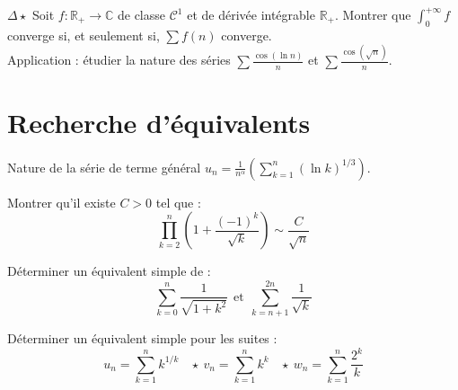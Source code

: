 \documentclass[french,a4paper]{article}
\newcommand{\R}{\mathbb{R}}
\newcommand{\C}{\mathbb{C}}
\theoremstyle{plain}
\theoremstyle{definition}
\theoremstyle{remark}
\begin{document}
\begin{ex}[Moulin.44]{$\Delta\star$}
	Soit $f:\R_+\to\C$ de classe $\mathcal{C}^1$ et de dérivée intégrable $\R_+$. Montrer que $\displaystyle\int_{0}^{+\infty}f$ converge si, et seulement si, $\displaystyle\sum f(n)$ converge. \\
	Application : étudier la nature des séries $\displaystyle\sum\frac{\cos(\ln n)}{n}$ et $\displaystyle\sum\frac{\cos(\sqrt{n})}{n}$.
\end{ex}

\section{Recherche d'équivalents}

\begin{ex}[Moulin.45]
	Nature de la série de terme général $u_n=\displaystyle\frac{1}{n^\alpha}\left(\sum_{k=1}^{n}(\ln k)^{1/3}\right)$.
\end{ex}

\begin{ex}[Moulin.46]{}
	Montrer qu'il existe $C>0$ tel que : $$\prod_{k=2}^{n}\left(1+\frac{(-1)^k}{\sqrt{k}}\right)\sim\frac{C}{\sqrt{n}}$$
\end{ex}

\begin{ex}[Moulin.47]{}
	Déterminer un équivalent simple de : $$\sum_{k=0}^{n}\frac{1}{\sqrt{1+k^2}}\ \ \text{et}\ \ \sum_{k=n+1}^{2n}\frac{1}{\sqrt{k}}$$
\end{ex}

\begin{ex}[Moulin.48]{}
	Déterminer un équivalent simple pour les suites : $$u_n=\sum_{k=1}^{n}k^{1/k}\ \ \ \ \star\ v_n=\sum_{k=1}^{n}k^k\ \ \ \ \star\ w_n=\sum_{k=1}^{n}\frac{2^k}{k}$$
\end{ex}
\end{document}
